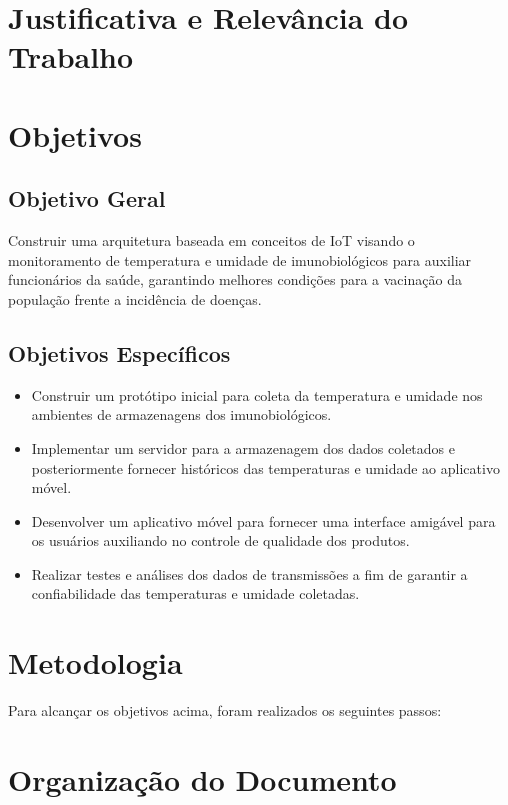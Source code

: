\section{Justificativa e Relevância do Trabalho}
\label{intro:justificativa}

\section{Objetivos}
\label{intro:objetivos}

\subsection{Objetivo Geral}
\label{intro:objetivos:geral}
Construir uma arquitetura baseada em conceitos de IoT visando o monitoramento de temperatura e umidade de imunobiológicos para auxiliar funcionários da saúde, garantindo melhores condições para a vacinação da população frente a incidência de doenças.

\subsection{Objetivos Específicos}
\label{intro:objetivos:especificos}
\begin{itemize}
  \item Construir um protótipo inicial para coleta da temperatura e umidade nos ambientes de armazenagens dos imunobiológicos.
  \item Implementar um servidor para a armazenagem dos dados coletados e posteriormente fornecer históricos das temperaturas e umidade ao aplicativo móvel.
  \item Desenvolver um aplicativo móvel para fornecer uma interface amigável para os usuários auxiliando no controle de qualidade dos produtos.
  \item Realizar testes e análises dos dados de transmissões a fim de garantir a confiabilidade das temperaturas e umidade coletadas.
\end{itemize}

\section{Metodologia}
\label{intro:metodologia}
Para alcançar os objetivos acima, foram realizados os seguintes passos:

\section{Organização do Documento}
\label{intro:organizacao}
